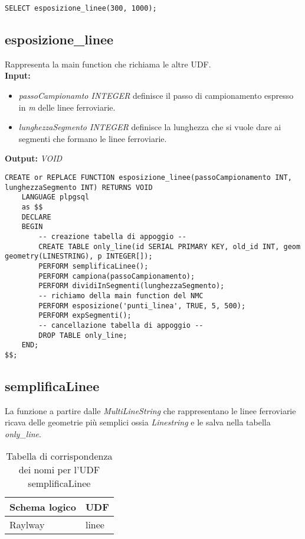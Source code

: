 \begin{lstlisting}[style=mySQL]
SELECT esposizione_linee(300, 1000);
\end{lstlisting}     

\subsection{esposizione\_linee}
Rappresenta la main function che richiama le altre UDF.\\
\textbf{Input:} 
\begin{itemize}
\item \textit{passoCampionamto INTEGER} definisce il passo di campionamento espresso in \textit{m} delle linee ferroviarie.
\item \textit{lunghezzaSegmento INTEGER} definisce la lunghezza che si vuole dare ai segmenti che formano le linee ferroviarie.
\end{itemize}
\textbf{Output:} \textit{VOID} 

\begin{lstlisting}[style=mySQL]
CREATE or REPLACE FUNCTION esposizione_linee(passoCampionamento INT, lunghezzaSegmento INT) RETURNS VOID
	LANGUAGE plpgsql
	as $$
	DECLARE
	BEGIN
		-- creazione tabella di appoggio --
		CREATE TABLE only_line(id SERIAL PRIMARY KEY, old_id INT, geom geometry(LINESTRING), p INTEGER[]);
		PERFORM semplificaLinee();
		PERFORM campiona(passoCampionamento);
		PERFORM dividiInSegmenti(lunghezzaSegmento);
		-- richiamo della main function del NMC
		PERFORM esposizione('punti_linea', TRUE, 5, 500);
		PERFORM expSegmenti();
		-- cancellazione tabella di appoggio --
		DROP TABLE only_line;
	END;
$$;
\end{lstlisting}

\subsection{semplificaLinee}
La funzione a partire dalle \textit{MultiLineString} che rappresentano le linee ferroviarie ricava delle geometrie più semplici ossia \textit{Linestring} e le salva nella tabella \textit{only\_line}.\\

\begin{table}[h]
\centering
\caption{Tabella di corrispondenza dei nomi per l'UDF semplificaLinee}
\label{mapTb4}
\begin{tabular}{|l|l|}
\hline
Schema logico       & UDF                \\ \hline
Raylway          & linee              \\ \hline
\end{tabular}
\end{table}

